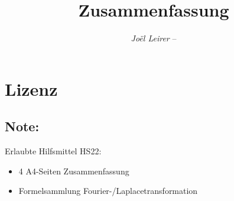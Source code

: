 \documentclass[margin=normal]{tex/hsrzf}
\author{\textsl{Joël Leirer} -- \texttt{\theauthoremail}}
\title{\texttt{\themodule} Zusammenfassung}
\date{\thesemester}
\begin{document}

\maketitle



\section*{Lizenz}
\doclicenseThis

\subsection*{Note:}
Erlaubte Hilfsmittel HS22:
\begin{itemize}
  \item 4 A4-Seiten Zusammenfassung
  \item Formelsammlung Fourier-/Laplacetransformation 
\end{itemize} 


\newpage
\tableofcontents

\clearpage
\setcounter{page}{1}









\newpage

\end{document}
